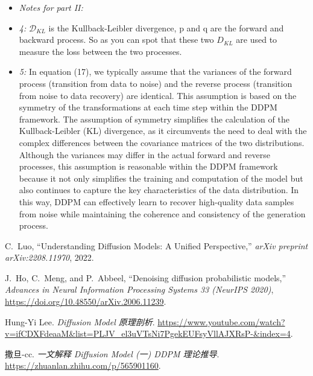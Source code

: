 \documentclass{article}
\begin{document}
\begin{itemize}
    \item \textit{Notes for part II:}
    \item \textit{4:} $\mathcal{D}_{KL}$ is the Kullback-Leibler divergence, p and q are the forward and backward process. So as you can spot that these two $D_{KL}$ are used to measure the loss between the two processes.
    \item \textit{5:} In equation (17), we typically assume that the variances of the forward process (transition from data to noise) and the reverse process (transition from noise to data recovery) are identical. 
    This assumption is based on the symmetry of the transformations at each time step within the DDPM framework. The assumption of symmetry simplifies the calculation of the Kullback-Leibler (KL) divergence, 
    as it circumvents the need to deal with the complex differences between the covariance matrices of the two distributions. Although the variances may differ in the actual forward and reverse processes, 
    this assumption is reasonable within the DDPM framework because it not only simplifies the training and computation of the model but also continues to capture the key characteristics of the data distribution. 
    In this way, DDPM can effectively learn to recover high-quality data samples from noise while maintaining the coherence and consistency of the generation process.
\end{itemize}

\renewcommand{\refname}{References}
\begin{thebibliography}{9}
    C.~Luo,
    ``Understanding Diffusion Models: A Unified Perspective,''
    \textit{arXiv preprint arXiv:2208.11970},
    2022.
    
    J.~Ho, C.~Meng, and P.~Abbeel,
    ``Denoising diffusion probabilistic models,''
    \textit{Advances in Neural Information Processing Systems 33 (NeurIPS 2020)}, 
    \url{https://doi.org/10.48550/arXiv.2006.11239}.

    Hung-Yi Lee.
    \textit{Diffusion Model 原理剖析}.
    \url{https://www.youtube.com/watch?v=ifCDXFdeaaM&list=PLJV_el3uVTsNi7PgekEUFsyVllAJXRsP-&index=4}.

    撒旦-cc.
    \textit{一文解释 Diffusion Model (一) DDPM 理论推导}.
    \url{https://zhuanlan.zhihu.com/p/565901160}.
\end{thebibliography}
\end{document}
